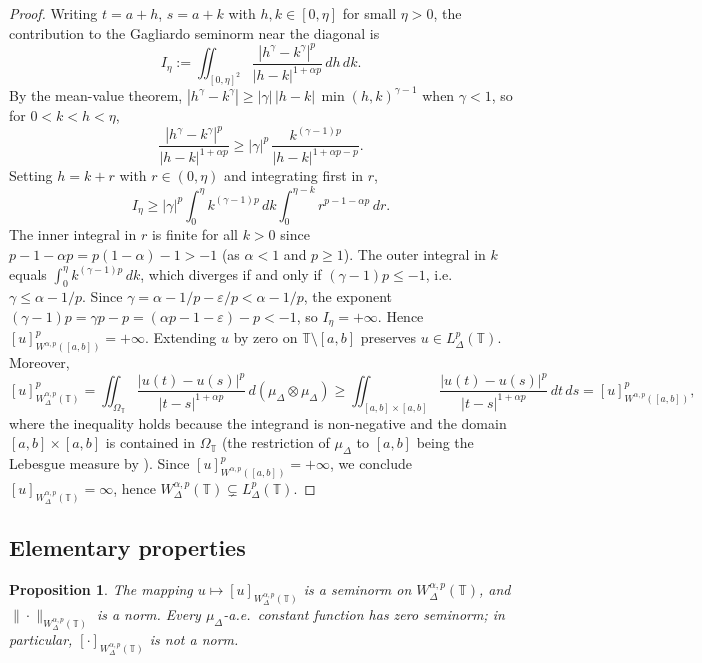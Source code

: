 \documentclass[11pt,a4paper]{article}
\numberwithin{equation}{section}
\newtheorem{proposition}[proposition]{Proposition}
\theoremstyle{definition}
\newcommand{\T}{\mathbb{T}}
\newcommand{\dd}{\,d}
\begin{document}
\begin{proof}
Writing $t=a+h$, $s=a+k$ with $h,k\in[0,\eta]$ for small $\eta>0$,
the contribution to the Gagliardo seminorm near the diagonal is
\begin{equation}\label{eq:powerfunction-integral}
I_\eta
:= \iint_{[0,\eta]^2}
\frac{|h^\gamma - k^\gamma|^p}{|h-k|^{1+\alpha p}}\,dh\,dk.
\end{equation}
By the mean-value theorem, $|h^\gamma - k^\gamma|
\ge |\gamma|\,|h-k|\,\min(h,k)^{\gamma-1}$ when $\gamma<1$,
so for $0<k<h<\eta$,
\[
\frac{|h^\gamma-k^\gamma|^p}{|h-k|^{1+\alpha p}}
\ge |\gamma|^p\,\frac{k^{(\gamma-1)p}}{|h-k|^{1+\alpha p-p}}.
\]
Setting $h=k+r$ with $r\in(0,\eta)$ and integrating first in $r$,
\[
I_\eta
\ge |\gamma|^p
\int_0^\eta k^{(\gamma-1)p}\dd k
\int_0^{\eta-k} r^{p-1-\alpha p}\dd r.
\]
The inner integral in $r$ is finite for all $k>0$ since
$p-1-\alpha p = p(1-\alpha)-1 > -1$ (as $\alpha<1$ and $p\ge 1$).
The outer integral in $k$ equals $\int_0^\eta k^{(\gamma-1)p}\dd k$,
which diverges if and only if $(\gamma-1)p\le -1$, i.e.\
$\gamma\le\alpha-1/p$. Since $\gamma=\alpha-1/p-\varepsilon/p<\alpha-1/p$,
the exponent $(\gamma-1)p = \gamma p - p = (\alpha p-1-\varepsilon)-p
< -1$, so $I_\eta=+\infty$.
Hence $[u]^p_{W^{\alpha,p}([a,b])}=+\infty$.
Extending $u$ by zero on $\T\setminus[a,b]$ preserves
$u\in L^p_\Delta(\T)$. Moreover,
\[
[u]^p_{W^{\alpha,p}_\Delta(\T)}
= \iint_{\Omega_\T}\frac{|u(t)-u(s)|^p}{|t-s|^{1+\alpha p}}
  \,d(\mu_\Delta\otimes\mu_\Delta)
\ge \iint_{[a,b]\times[a,b]}
  \frac{|u(t)-u(s)|^p}{|t-s|^{1+\alpha p}}\,dt\,ds
= [u]^p_{W^{\alpha,p}([a,b])},
\]
where the inequality holds because the integrand is non-negative and
the domain $[a,b]\times[a,b]$ is contained in $\Omega_\T$
(the restriction of $\mu_\Delta$ to $[a,b]$ being the Lebesgue measure
by \cite[Theorem~5.2]{CabadaVivero2006}).
Since $[u]^p_{W^{\alpha,p}([a,b])}=+\infty$, we conclude
$[u]_{W^{\alpha,p}_\Delta(\T)}=\infty$,
hence $W^{\alpha,p}_\Delta(\T)\subsetneq L^p_\Delta(\T)$.
\end{proof}
\subsection{Elementary properties}

\begin{proposition}\label{prop:seminorm-and-norm}
The mapping $u\mapsto [u]_{W^{\alpha,p}_{\Delta}(\T)}$ is a seminorm on $W^{\alpha,p}_{\Delta}(\T)$, and $\|\cdot\|_{W^{\alpha,p}_{\Delta}(\T)}$ is a norm. Every $\mu_\Delta$-a.e.\ constant function has zero seminorm; in particular, $[\cdot]_{W^{\alpha,p}_{\Delta}(\T)}$ is not a norm.
\end{proposition}
\end{document}
